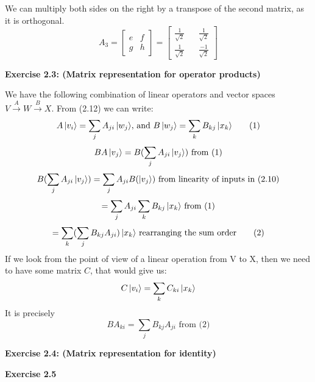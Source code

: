 \documentclass{article}
\begin{document}
\begin{framed}
$$    $$
    We can multiply both sides on the right by a transpose of the second matrix, as it is orthogonal.
    $$
    A_3 = \begin{bmatrix} e & f \\ g & h \end{bmatrix} = \begin{bmatrix} \frac{1}{\sqrt{2}} && \frac{1}{\sqrt{2}} \\ \frac{1}{\sqrt{2}} && \frac{-1}{\sqrt{2}} \end{bmatrix}
    $$
\end{framed}

\bigskip

\begin{framed}
    \noindent \textbf{Exercise 2.3: (Matrix representation for operator products)}

    \medskip
    We have the following combination of linear operators and vector spaces $V \xrightarrow{A} W \xrightarrow{B} X$. From (2.12) we can write: 
    \begin{equation}
        A\ket{v_i} = \sum_{j}{A_{ji}\ket{w_j}}\text{, and } B\ket{w_j} = \sum_{k}{B_{kj}\ket{x_k}} 
        \tag{1}
    \end{equation}
    $$BA\ket{v_j} = B(\sum_{j}{A_{ji}\ket{v_j}}) \text{ from (1)}$$
    $$
    B(\sum_{j}{A_{ji}\ket{v_j}}) = \sum_{j}{A_{ji}B(\ket{v_j}}) \text{ from linearity of inputs in (2.10)}
    $$
    $$
     = \sum_{j}{A_{ji}\sum_{k}{B_{kj}\ket{x_k}}} \text{ from (1)}
    $$
    \begin{equation}
    = \sum_k(\sum_j{B_{kj}A_{ji}) \ket{x_k}} \text{ rearranging the sum order}
    \tag{2}
    \end{equation}
    If we look from the point of view of a linear operation from V to X, then we need to have some matrix $C$, that would give us:
    $$C\ket{v_i} = \sum_k{C_{ki}\ket{x_k}}$$
    It is precisely 
    $$
    BA_{ki} = \sum_j{B_{kj}A_{ji}} \text{ from (2)}
    $$
\end{framed}

\bigskip

\begin{framed}
    \noindent \textbf{Exercise 2.4: (Matrix representation for identity)}

    \medskip
    
\end{framed}

\bigskip

\begin{framed}
    \noindent \textbf{Exercise 2.5}

    \medskip
\end{framed}
\end{document}
